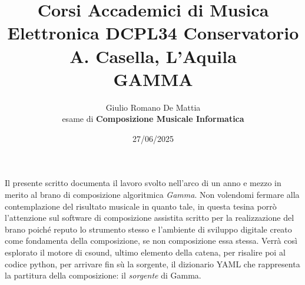 \documentclass[a4paper,12pt]{article}
\title{Corsi Accademici di Musica Elettronica DCPL34 Conservatorio A. Casella, L'Aquila \\ \fontsize{14}{17}\bfseries\uppercase{Gamma}}
\author{Giulio Romano De Mattia \\ esame di \bfseries{Composizione Musicale Informatica} }
\date{27/06/2025}
\begin{document}
\maketitle
\thispagestyle{empty}

\begin{center}
    \vspace{1cm}
    \textbf{\fontsize{12}{15}\selectfont{Sommario}}
\end{center}

Il presente scritto documenta il lavoro svolto nell'arco di un anno e mezzo in merito al brano di composizione algoritmica \textit{Gamma}. Non volendomi fermare 
alla contemplazione del risultato musicale in quanto tale, in questa tesina porrò l'attenzione sul software di composizione assistita scritto per la realizzazione 
del brano poiché reputo lo strumento stesso e l'ambiente di sviluppo digitale creato come fondamenta della composizione, se non composizione essa stessa. 
Verrà così esplorato il motore di csound, ultimo elemento della catena, per risalire poi al codice python, per arrivare fin sù la sorgente, il dizionario YAML che rappresenta la partitura della composizione: il \textit{sorgente} di Gamma.



\newpage
\tableofcontents  

\newpage



%
%
\end{document}

